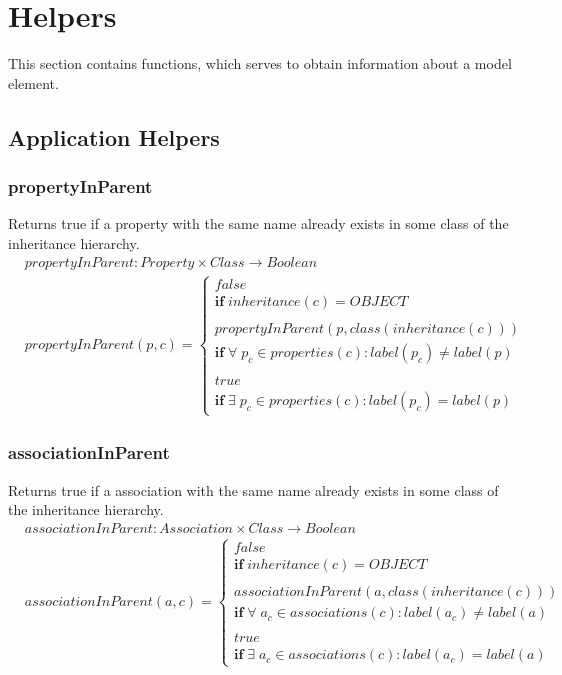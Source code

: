 \documentclass[10pt]{article}
\begin{document}
\section{Helpers}
This section contains functions, which serves to obtain information about a model element.
\subsection{Application Helpers}

\subsubsection{propertyInParent}
Returns true if a property with the same name already exists in some class of the inheritance hierarchy.
\begin{align}
& propertyInParent: Property \times Class \rightarrow Boolean \\
& propertyInParent(p, c) = \begin{cases}
 false \\
 \mathbf{if} \; inheritance(c) = OBJECT \\ \\
 propertyInParent(p, class(inheritance(c))) \\
 \mathbf{if} \; \forall \; p_c \in properties(c) : label(p_c) \neq label(p) \\ \\
 true \\
 \mathbf{if} \; \exists \; p_c \in properties(c) : label(p_c) = label(p) 
 \end{cases}
\end{align}

\subsubsection{associationInParent}
Returns true if a association with the same name already exists in some class of the inheritance hierarchy.
\begin{align}
& associationInParent: Association \times Class \rightarrow Boolean \\
& associationInParent(a, c) = \begin{cases}
 false \\
 \mathbf{if} \; inheritance(c) = OBJECT \\ \\
 associationInParent(a, class(inheritance(c))) \\
 \mathbf{if} \; \forall \; a_c \in associations(c) : label(a_c) \neq label(a) \\ \\
 true \\
 \mathbf{if} \; \exists \; a_c \in associations(c) : label(a_c) = label(a) 
 \end{cases}
\end{align}
\end{document}
